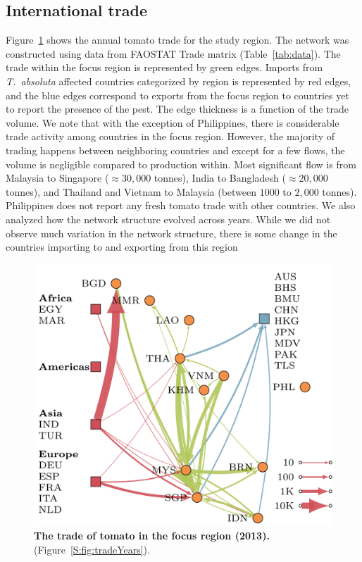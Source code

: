 \documentclass[10pt]{article}
\theoremstyle{definition}
\newcommand{\tuta}{\emph{T.~absoluta}}
\begin{document}
\subsection{International trade}
Figure~\ref{fig:tomnet} shows the annual tomato trade for the study region. The
network was constructed using data from FAOSTAT Trade matrix
(Table~\ref{tab:data}).  The trade within the focus region is represented
by green edges. Imports from \tuta{} affected countries categorized by
region is represented by red edges, and the blue edges correspond to
exports from the focus region to countries yet to report the presence of
the pest. The edge thickness is a function of the trade volume. We note
that with the exception of Philippines, there is considerable trade
activity among countries in the focus region. However, the majority of
trading happens between neighboring countries and except for a few flows,
the volume is negligible compared to production within. Most significant
flow is from Malaysia to Singapore ($\approx30,000$ tonnes), India to
Bangladesh ($\approx20,000$ tonnes), and Thailand and Vietnam to Malaysia
(between $1000$ to $2,000$ tonnes). Philippines does not report any fresh
tomato trade with other countries.  We also analyzed how the network
structure evolved across years. While we did not observe much variation in
the network structure, there is some change in the countries importing to
and exporting from this region
\begin{figure}[t]
\centering
\includegraphics[width=.6\textwidth]{../international_trade/results/network_plots/sea_2013_tomato.pdf}
\caption{\textbf{The trade of tomato in the focus region
(2013).}(Figure~\ref{S:fig:tradeYears}).\label{fig:tomnet}}
\end{figure}
\end{document}
